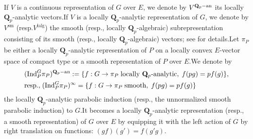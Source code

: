 \documentclass[10pt]{article}
\newcommand{\gal}{{\rm Gal}}
\newcommand{\ana}{{\rm an}}
\newcommand{\op}{{\overline{{\mathbf{P}}}}}
\newcommand{\bP}{{\mathbf{P}}}
\newcommand{\bQ}{{\mathbf{Q}}}
\newcommand{\sW}{\mathscr W}
\begin{document}





If $V$ is a continuous representation of $G$ over $E$, we denote by $V^{\bQ_p-\ana}$ its locally $\bQ_p$-analytic vectors.\;If $V$ is a locally $\bQ_p$-analytic representation of $G$, we denote by $V^{\mathrm{sm}}$ (resp.\;$V^{\mathrm{lalg}}$) the smooth (resp., locally $\bQ_p$-algebraic) subrepresentation consisting of its smooth (resp., locally $\bQ_p$-algebraic) vectors; see \cite{Emerton2007summary} for details.\;Let $\pi_P$ be either a locally $\bQ_p$-analytic representation of $P$ on a locally convex $E$-vector space of compact type or a smooth representation of $P$ over $E$.\;We denote by
\begin{equation}\label{smoothadj2}
	\begin{aligned}
		&(\mathrm{Ind}_{P}^{G}\pi_P)^{\bQ_p-\ana}:=\{f:G\rightarrow \pi_P \text{\;locally $\bQ_p$-analytic},\;f(pg)=pf(g)\},\\
		&\text{resp.,\;}(\mathrm{Ind}_{P}^{G}\pi_P)^{\infty}=\{f:G\rightarrow \pi_P \text{\;smooth},\;f(pg)=pf(g)\}
	\end{aligned}
\end{equation}
the locally $\bQ_p$-analytic parabolic induction (resp., the unnormalized smooth parabolic induction) to $G$.\;It becomes a locally $\bQ_p$-analytic representation (resp., a smooth representation) of $G$ over $E$ by equipping it with the left action of $G$ by right translation on functions: $(gf)(g')=f(g'g)$.\;


\end{document}
